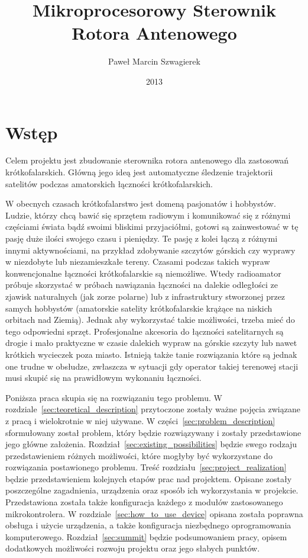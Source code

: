 \documentclass[eng,oneside]{mgr}
\title{Mikroprocesorowy Sterownik Rotora Antenowego}
\author{Paweł Marcin Szwagierek}
\date{2013}
\begin{document}
	 
	\maketitle

	\tableofcontents

	\chapter{Wstęp}
	Celem projektu jest zbudowanie sterownika rotora antenowego dla zastosowań krótkofalarskich. Główną jego ideą jest automatyczne śledzenie trajektorii satelitów podczas amatorskich łączności krótkofalarskich. 

	W obecnych czasach krótkofalarstwo jest domeną pasjonatów i hobbystów. Ludzie, którzy chcą bawić się sprzętem radiowym i komunikować się z różnymi częściami świata bądź swoimi bliskimi przyjaciółmi, gotowi są zainwestować w tę pasję duże ilości swojego czasu i pieniędzy. Te pasję z kolei łączą z różnymi innymi aktywnościami, na przykład zdobywanie szczytów górskich czy wyprawy w niezdobyte lub niezamieszkałe tereny. Czasami podczas takich wypraw konwencjonalne łączności krótkofalarskie są niemożliwe. Wtedy radioamator próbuje skorzystać w próbach nawiązania łączności na dalekie odległości ze zjawisk naturalnych (jak zorze polarne) lub z infrastruktury stworzonej przez samych hobbystów (amatorskie satelity krótkofalarskie krążące na niskich orbitach nad Ziemią). Jednak aby wykorzystać takie możliwości, trzeba mieć do tego odpowiedni sprzęt. Profesjonalne akcesoria do łączności satelitarnych są drogie i mało praktyczne w czasie dalekich wypraw na górskie szczyty lub nawet krótkich wycieczek poza miasto. Istnieją także tanie rozwiązania które są jednak one trudne w obsłudze, zwłaszcza w sytuacji gdy operator takiej terenowej stacji musi skupić się na prawidłowym wykonaniu łączności.

	Poniższa praca skupia się na rozwiązaniu tego problemu. W rozdziale~\ref{sec:teoretical_description} przytoczone zostały ważne pojęcia związane z pracą i wielokrotnie w niej używane. W części~\ref{sec:problem_description} sformułowany został problem, który będzie rozwiązywany i zostały przedstawione jego główne założenia. Rozdział~\ref{sec:existing_possibilities} będzie swego rodzaju przedstawieniem różnych możliwości, które mogłyby być wykorzystane do rozwiązania postawionego problemu. Treść rozdziału~\ref{sec:project_realization} będzie przedstawieniem kolejnych etapów prac nad projektem. Opisane zostały poszczególne zagadnienia, urządzenia oraz sposób ich wykorzystania w projekcie. Przedstawiona została także konfiguracja każdego z modułów zastosowanego mikrokontrolera. W rozdziale~\ref{sec:how_to_use_device} opisana została poprawna obsługa i użycie urządzenia, a także konfiguracja niezbędnego oprogramowania komputerowego. Rozdział~\ref{sec:summit} będzie podsumowaniem pracy, opisem dodatkowych możliwości rozwoju projektu oraz jego słabych punktów.
\end{document}
